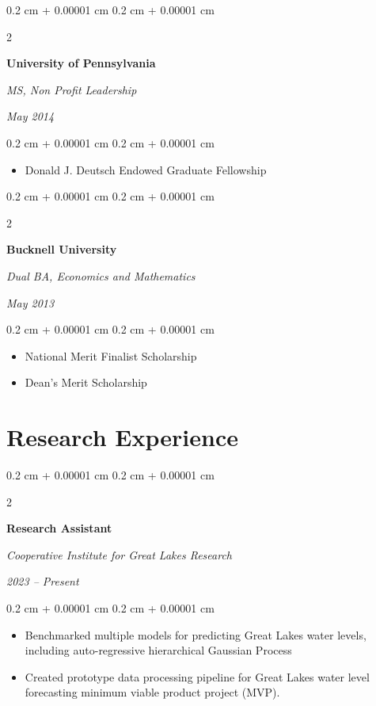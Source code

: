 \documentclass[11pt, letterpaper]{article}
\newenvironment{highlights}{
    \begin{itemize}[
        topsep=0.10 cm,
        parsep=0.10 cm,
        partopsep=0pt,
        itemsep=0pt,
        leftmargin=0.4 cm + 10pt
    ]
}{
    \end{itemize}
} %
\newenvironment{onecolentry}{
    \begin{adjustwidth}{
        0.2 cm + 0.00001 cm
    }{
        0.2 cm + 0.00001 cm
    }
}{
    \end{adjustwidth}
} %
\newenvironment{twocolentry}[2][]{
    \onecolentry
    \def\secondColumn{#2}
    \setcolumnwidth{\fill, 4.5 cm}
    \begin{paracol}{2}
}{
    \switchcolumn \raggedleft \secondColumn
    \end{paracol}
    \endonecolentry
} %
\begin{document}
\vspace{0.2 cm}
\begin{twocolentry}{
        \textit{May 2014}}
    \textbf{University of Pennsylvania}

    \textit{MS, Non Profit Leadership}
\end{twocolentry}
\vspace{0.05 cm}
\begin{onecolentry}
    \begin{highlights}
        \item Donald J. Deutsch Endowed Graduate Fellowship
    \end{highlights}
\end{onecolentry}

\vspace{0.2 cm}
\begin{twocolentry}{
        \textit{May 2013}}
    \textbf{Bucknell University}

    \textit{Dual BA, Economics and Mathematics}
\end{twocolentry}
\vspace{0.05 cm}
\begin{onecolentry}
    \begin{highlights}
        \item National Merit Finalist Scholarship
        \item Dean's Merit Scholarship
    \end{highlights}
\end{onecolentry}


\section{Research Experience}

\begin{twocolentry}{\textit{2023 – Present}}
    \textbf{Research Assistant}

    \textit{Cooperative Institute for Great Lakes Research}
\end{twocolentry}

\vspace{0.05 cm}
\begin{onecolentry}
    \begin{highlights}
        \item Benchmarked multiple models for predicting Great Lakes water levels, including auto-regressive hierarchical Gaussian Process
        \item Created prototype data processing pipeline for Great Lakes water level forecasting minimum viable product project (MVP).
    \end{highlights}
\end{onecolentry}
\end{document}

